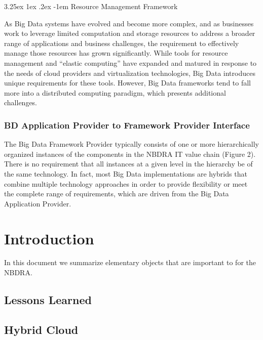 \documentclass[9pt,twocolumn]{styles/osajnl}
\makeatletter
\renewcommand\paragraph{\@startsection{paragraph}{5}{\z@}%
  {3.25ex \@plus1ex \@minus.2ex}%
  {-1em}%
  {\normalfont\normalsize\bfseries}}
\makeatother
\begin{document}
\paragraph{Resource Management Framework}

As Big Data systems have evolved and become more complex, and as businesses work to leverage limited computation and storage resources to address a broader range of applications and business challenges, the requirement to effectively manage those resources has grown significantly. While tools for resource management and “elastic computing” have expanded and matured in response to the needs of cloud providers and virtualization technologies, Big Data introduces unique requirements for these tools. However, Big Data frameworks tend to fall more into a distributed computing paradigm, which presents additional challenges. 

\subsubsection{BD Application Provider to Framework Provider
  Interface}

The Big Data Framework Provider typically consists of one or more hierarchically organized instances of the components in the NBDRA IT value chain (Figure 2). There is no requirement that all instances at a given level in the hierarchy be of the same technology. In fact, most Big Data implementations are hybrids that combine multiple technology approaches in order to provide flexibility or meet the complete range of requirements, which are driven from the Big Data Application Provider. 


	
\section{Introduction}

In this document we summarize elementary objects that are important to
for the NBDRA.

\subsection{Lessons Learned}


\subsection{Hybrid Cloud}
\end{document}
